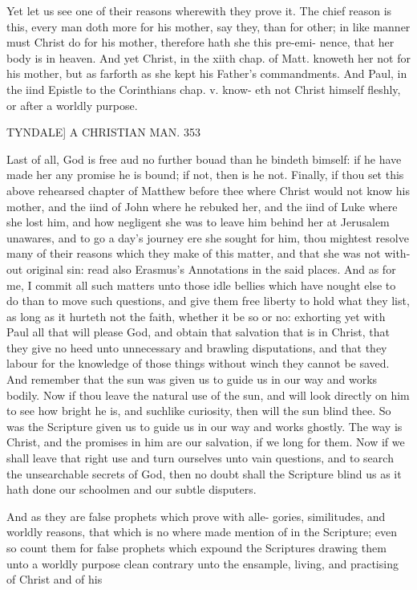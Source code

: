 \documentclass{custom}
\begin{document}
{Yet let us see one of their reasons wherewith they prove 
it. The chief reason is this, every man doth more for his 
mother, say they, than for other; in like manner must 
Christ do for his mother, therefore hath she this pre-emi- 
nence, that her body is in heaven. And yet Christ, in the 
xiith chap. of Matt. knoweth her not for his mother, but 
as farforth as she kept his Father's commandments. And 
Paul, in the iind Epistle to the Corinthians chap. v. know- 
eth not Christ himself fleshly, or after a worldly purpose. 


TYNDALE]
A CHRISTIAN MAN.
353

Last of all, God is free aud no further bouad than he 
bindeth bimself: if he have made her any promise he is 
bound; if not, then is he not. Finally, if thou set this 
above rehearsed chapter of Matthew before thee where Christ 
would not know his mother, and the iind of John where 
he rebuked her, and the iind of Luke where she lost him, 
and how negligent she was to leave him behind her at 
Jerusalem unawares, and to go a day's journey ere she 
sought for him, thou mightest resolve many of their reasons 
which they make of this matter, and that she was not with- 
out original sin: read also Erasmus's Annotations in the 
said places. And as for me, I commit all such matters 
unto those idle bellies which have nought else to do than 
to move such questions, and give them free liberty to hold 
what they list, as long as it hurteth not the faith, whether 
it be so or no: exhorting yet with Paul all that will please 
God, and obtain that salvation that is in Christ, that they 
give no heed unto unnecessary and brawling disputations, 
and that they labour for the knowledge of those things 
without winch they cannot be saved. And remember that 
the sun was given us to guide us in our way and works 
bodily. Now if thou leave the natural use of the sun, and 
will look directly on him to see how bright he is, and suchlike 
curiosity, then will the sun blind thee. So was the Scripture 
given us to guide us in our way and works ghostly. The 
way is Christ, and the promises in him are our salvation, if we 
long for them. Now if we shall leave that right use and turn 
ourselves unto vain questions, and to search the unsearchable 
secrets of God, then no doubt shall the Scripture blind us 
as it hath done our schoolmen and our subtle disputers. 

And as they are false prophets which prove with alle- 
gories, similitudes, and worldly reasons, that which is no 
where made mention of in the Scripture; even so count 
them for false prophets which expound the Scriptures 
drawing them unto a worldly purpose clean contrary unto 
the ensample, living, and practising of Christ and of his 

}
\end{document}
